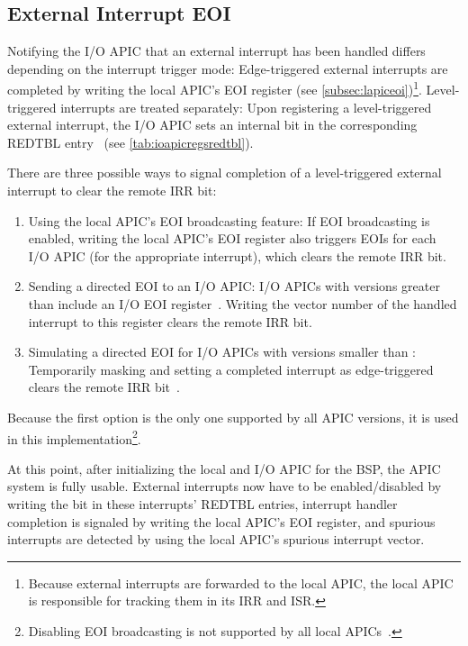 \subsection{External Interrupt EOI}
\label{subsec:ioapiceoi}

Notifying the I/O APIC that an external interrupt has been handled differs depending on the interrupt trigger mode: Edge-triggered external interrupts are completed by writing the local APIC's EOI register (see \autoref{subsec:lapiceoi})\footnote{
  Because external interrupts are forwarded to the local APIC, the local APIC is responsible for tracking them in its IRR and ISR.}.
Level-triggered interrupts are treated separately: Upon registering a level-triggered external interrupt, the I/O APIC sets an internal  bit in the corresponding REDTBL entry~\autocite[sec.~9.5.8]{ich5} (see \autoref{tab:ioapicregsredtbl}).

There are three possible ways to signal completion of a level-triggered external interrupt to clear the remote IRR bit:

\begin{enumerate}
  \item Using the local APIC's EOI broadcasting feature: If EOI broadcasting is enabled, writing the local APIC's EOI register also triggers EOIs for each I/O APIC (for the appropriate interrupt), which clears the remote IRR bit.
  \item Sending a directed EOI to an I/O APIC\@: I/O APICs with versions greater than  include an I/O EOI register~\autocite[sec.~9.5.5]{ich5}.
        Writing the vector number of the handled interrupt to this register clears the remote IRR bit.
  \item Simulating a directed EOI for I/O APICs with versions smaller than : Temporarily masking and setting a completed interrupt as edge-triggered clears the remote IRR bit~\autocite[io\textunderscore{}apic.c]{linux}.
\end{enumerate}

Because the first option is the only one supported by all APIC versions, it is used in this implementation\footnote{
  Disabling EOI broadcasting is not supported by all local APICs~\autocite[sec.~3.11.8.5]{ia32}.}.

At this point, after initializing the local and I/O APIC for the BSP, the APIC system is fully usable.
External interrupts now have to be enabled/disabled by writing the  bit in these interrupts' REDTBL entries, interrupt handler completion is signaled by writing the local APIC's EOI register, and spurious interrupts are detected by using the local APIC's spurious interrupt vector.

